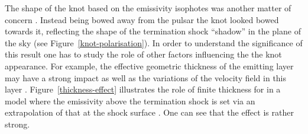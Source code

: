 The shape of the knot based on the emissivity isophotes was another matter of concern \citep{YB-15}. Instead being bowed away from the pulsar the knot looked bowed towards it, reflecting the shape of the termination shock ``shadow'' in the plane of the sky (see Figure~\ref{knot-polarisation}). In order to understand the significance of this result one has to study the role of other factors influencing the the knot appearance. For example,  the effective geometric thickness of the emitting layer may have a strong impact as well as the variations of the velocity field in this layer \citep{LKP-16,YB-15}.  Figure~\ref{thickness-effect} illustrates the role of finite thickness for in a model where the emissivity above the termination shock is set via an extrapolation of that at the shock surface \citep{LKP-16}. One can see that the effect is rather strong.    

